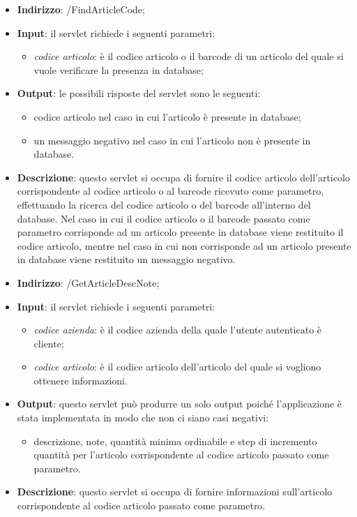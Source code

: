 \begin{itemize}
	\item \textbf{Indirizzo}: /FindArticleCode;
	\item \textbf{Input}: il servlet richiede i seguenti parametri:
		\begin{itemize}
			\item \textit{codice articolo}: è il codice articolo o il barcode di un articolo del quale si vuole verificare la presenza in database;
		\end{itemize}
	\item \textbf{Output}: le possibili risposte del servlet sono le seguenti:
		\begin{itemize}
			\item codice articolo nel caso in cui l'articolo è presente in database;
			\item un messaggio negativo nel caso in cui l'articolo non è presente in database.
		\end{itemize}
	\item \textbf{Descrizione}: questo servlet si occupa di fornire il codice articolo dell'articolo corrispondente al codice articolo o al barcode ricevuto come parametro, effettuando la ricerca del codice articolo o del barcode all'interno del database. Nel caso in cui il codice articolo o il barcode passato come parametro corrisponde ad un articolo presente in database viene restituito il codice articolo, mentre nel caso in cui non corrisponde ad un articolo presente in database viene restituito un messaggio negativo.
\end{itemize}


\begin{itemize}
	\item \textbf{Indirizzo}: /GetArticleDescNote;
	\item \textbf{Input}: il servlet richiede i seguenti parametri:
		\begin{itemize}
			\item \textit{codice azienda}: è il codice azienda della quale l'utente autenticato è cliente;
			\item \textit{codice articolo}: è il codice articolo dell'articolo del quale si vogliono ottenere informazioni.
		\end{itemize}
	\item \textbf{Output}: questo servlet può produrre un solo output poiché l'applicazione è stata implementata in modo che non ci siano casi negativi:
		\begin{itemize}
			\item descrizione, note, quantità minima ordinabile e step di incremento quantità per l'articolo corrispondente al codice articolo passato come parametro.
		\end{itemize}
	\item \textbf{Descrizione}: questo servlet si occupa di fornire informazioni sull'articolo corrispondente al codice articolo passato come parametro. 
\end{itemize}

